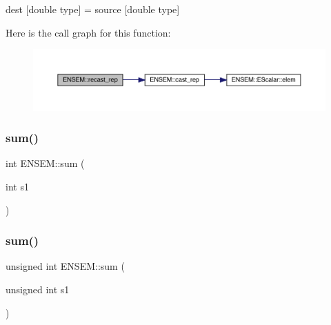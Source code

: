 dest \mbox{[}double type\mbox{]} = source \mbox{[}double type\mbox{]} 

Here is the call graph for this function\+:\nopagebreak
\begin{figure}[H]
\begin{center}
\leavevmode
\includegraphics[width=350pt]{dd/d99/group__simpleword_ga9c4fac4c3903b043a9a31c9036f875f7_cgraph}
\end{center}
\end{figure}
\mbox{\label{group__simpleword_ga971787584a79f9a0e9938d4df2021d3f}} 
\subsubsection{\texorpdfstring{sum()}{sum()}\hspace{0.1cm}{\footnotesize\ttfamily [1/4]}}
{\footnotesize\ttfamily int E\+N\+S\+E\+M\+::sum (\begin{DoxyParamCaption}\item[{int}]{s1 }\end{DoxyParamCaption})\hspace{0.3cm}{\ttfamily [inline]}}

\mbox{\label{group__simpleword_ga935361714bfaafc123769fd11a4c1e85}} 
\subsubsection{\texorpdfstring{sum()}{sum()}\hspace{0.1cm}{\footnotesize\ttfamily [2/4]}}
{\footnotesize\ttfamily unsigned int E\+N\+S\+E\+M\+::sum (\begin{DoxyParamCaption}\item[{unsigned int}]{s1 }\end{DoxyParamCaption})\hspace{0.3cm}{\ttfamily [inline]}}

